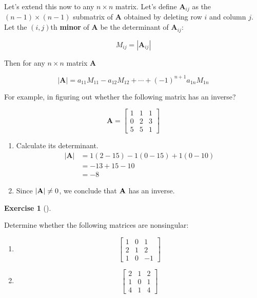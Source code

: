 \documentclass[
  letterpaper,
]{book}
\theoremstyle{definition}
\theoremstyle{definition}
\theoremstyle{plain}
\theoremstyle{definition}
\newtheorem{exercise}{Exercise}[chapter]
\theoremstyle{plain}
\theoremstyle{plain}
\theoremstyle{remark}
\begin{document}
Let's extend this now to any \(n\times n\) matrix. Let's define
\(\mathbf{A}_{ij}\) as the \((n-1)\times (n-1)\) submatrix of
\(\mathbf{A}\) obtained by deleting row \(i\) and column \(j\). Let the
\((i,j)\)th \textbf{minor} of \(\mathbf{A}\) be the determinant of
\(\mathbf{A}_{ij}\):

\[M_{ij} = \left|\mathbf{A}_{ij}\right|\]

Then for any \(n\times n\) matrix \(\mathbf{A}\)

\[|\mathbf{A}| = a_{11}M_{11} - a_{12}M_{12} + \cdots + (-1)^{n+1} a_{1n} M_{1n}\]

For example, in figuring out whether the following matrix has an
inverse?

\[\mathbf{A}=\begin{bmatrix} 1&1&1\\0&2&3\\5&5&1 \end{bmatrix}\]

\begin{enumerate}
\def\labelenumi{\arabic{enumi}.}
\item
  Calculate its determinant. \[\begin{align*}
   |\mathbf{A}| &= 1(2-15) - 1(0-15) + 1(0-10) \nonumber\\
   &= -13+15-10 \nonumber\\
   &= -8\nonumber
   \end{align*}\]
\item
  Since \(|{\bf A}|\ne 0\), we conclude that \({\bf A}\) has an inverse.
\end{enumerate}

\leavevmode{}%
\begin{exercise}[]\label{exr-determinants}

Determine whether the following matrices are nonsingular:

\begin{enumerate}
\def\labelenumi{\arabic{enumi}.}
\item
  \[\begin{bmatrix}
    1 & 0 & 1\\
    2 & 1 & 2\\
    1 & 0 & -1
    \end{bmatrix}\]
\item
  \[\begin{bmatrix}
       2 & 1 & 2\\
       1 & 0 & 1\\
       4 & 1 & 4
   \end{bmatrix}\]
\end{enumerate}

\end{exercise}
\end{document}
